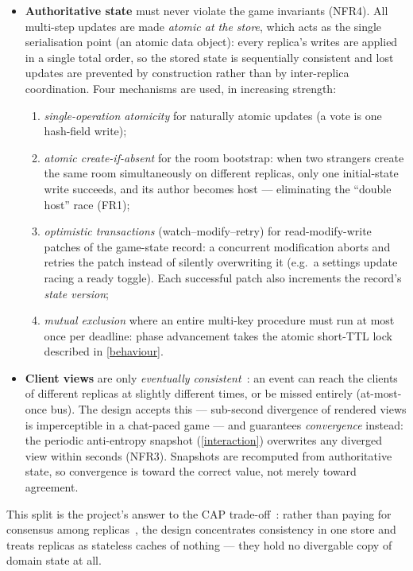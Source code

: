 \documentclass{scrartcl}
\begin{document}
\begin{itemize}
  \item \textbf{Authoritative state} must never violate the game
  invariants (NFR4). All multi-step updates are made \emph{atomic at the
  store}, which acts as the single serialisation point (an atomic data
  object): every replica's writes are applied in a single total order, so
  the stored state is sequentially consistent and lost updates are
  prevented by construction rather than by inter-replica coordination.
  Four mechanisms are used, in increasing strength:
  \begin{enumerate}
    \item \emph{single-operation atomicity} for naturally atomic updates
    (a vote is one hash-field write);
    \item \emph{atomic create-if-absent} for the room bootstrap: when two
    strangers create the same room simultaneously on different replicas,
    only one initial-state write succeeds, and its author becomes host ---
    eliminating the ``double host'' race (FR1);
    \item \emph{optimistic transactions} (watch--modify--retry) for
    read-modify-write patches of the game-state record: a concurrent
    modification aborts and retries the patch instead of silently
    overwriting it (e.g.\ a settings update racing a ready toggle). Each
    successful patch also increments the record's \emph{state version};
    \item \emph{mutual exclusion} where an entire multi-key procedure
    must run at most once per deadline: phase advancement takes the
    atomic short-TTL lock described in \cref{behaviour}.
  \end{enumerate}

  \item \textbf{Client views} are only \emph{eventually
  consistent}~\cite{vogels2009eventually}: an event can reach the clients
  of different replicas at slightly different times, or be missed
  entirely (at-most-once bus). The design accepts this --- sub-second
  divergence of rendered views is imperceptible in a chat-paced game ---
  and guarantees \emph{convergence} instead: the periodic anti-entropy
  snapshot (\cref{interaction}) overwrites any diverged view within
  seconds (NFR3). Snapshots are recomputed from authoritative state, so
  convergence is toward the correct value, not merely toward agreement.
\end{itemize}

This split is the project's answer to the CAP
trade-off~\cite{gilbert2002brewer}: rather than paying for consensus among
replicas~\cite{fischer1985impossibility}, the design concentrates
consistency in one store and treats replicas as stateless caches of
nothing --- they hold no divergable copy of domain state at all.
\end{document}
